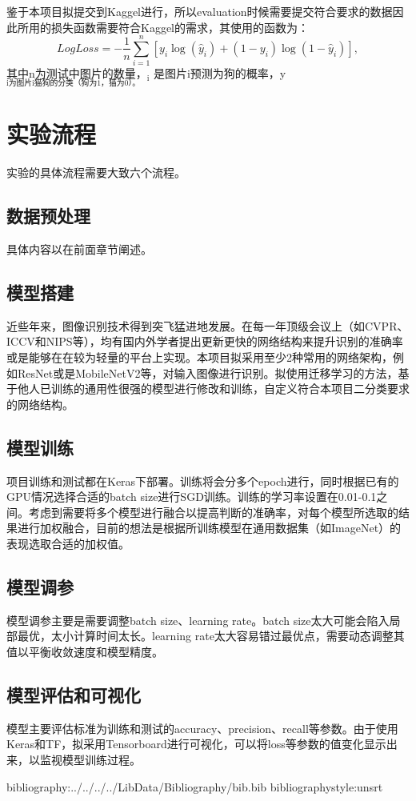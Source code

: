\documentclass[a4paper,11pt]{article}
\begin{document}
鉴于本项目拟提交到Kaggel进行，所以evaluation时候需要提交符合要求的数据因此所用的损失函数需要符合Kaggel的需求，其使用的函数为：
\begin{equation}
\label{eq:kaggelE}
LogLoss = -\frac{1}{n}\sum_{i=1}^{n}[y_i\log{(\hat{y}_i)}+(1-y_i)\log{(1-\hat{y}_i)}],
\end{equation}
其中n为测试中图片的数量，$_{\text{i}}$ 是图片i预测为狗的概率，y$_{\text{i为图片i猫狗的分类（狗为1，猫为0）。}}$

\section{实验流程}
\label{sec-5}
实验的具体流程需要大致六个流程。
\subsection{数据预处理}
\label{sec-5-1}
具体内容以在前面章节阐述。
\subsection{模型搭建}
\label{sec-5-2}
近些年来，图像识别技术得到突飞猛进地发展。在每一年顶级会议上（如CVPR、ICCV和NIPS等），均有国内外学者提出更新更快的网络结构来提升识别的准确率或是能够在在较为轻量的平台上实现。本项目拟采用至少2种常用的网络架构，例如ResNet或是MobileNetV2等，对输入图像进行识别。拟使用迁移学习的方法，基于他人已训练的通用性很强的模型进行修改和训练，自定义符合本项目二分类要求的网络结构。
\subsection{模型训练}
\label{sec-5-3}
项目训练和测试都在Keras下部署。训练将会分多个epoch进行，同时根据已有的GPU情况选择合适的batch size进行SGD训练。训练的学习率设置在0.01-0.1之间。考虑到需要将多个模型进行融合以提高判断的准确率，对每个模型所选取的结果进行加权融合，目前的想法是根据所训练模型在通用数据集（如ImageNet）的表现选取合适的加权值。
\subsection{模型调参}
\label{sec-5-4}
模型调参主要是需要调整batch size、learning rate。batch size太大可能会陷入局部最优，太小计算时间太长。learning rate太大容易错过最优点，需要动态调整其值以平衡收敛速度和模型精度。
\subsection{模型评估和可视化}
\label{sec-5-5}
模型主要评估标准为训练和测试的accuracy、precision、recall等参数。由于使用Keras和TF，拟采用Tensorboard进行可视化，可以将loss等参数的值变化显示出来，以监视模型训练过程。



bibliography:../../../../LibData/Bibliography/bib.bib
bibliographystyle:unsrt
\end{document}
